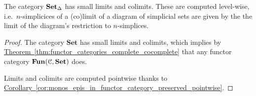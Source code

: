 \documentclass[main.tex]{subfiles}
\begin{document}
\begin{proposition}
  \label{prop:sset_has_limits_colimits}
  The category $\operatorname{\mathbf{Set}_{\Delta}}$ has small limits and colimits. These are computed level-wise, i.e.\ $n$-simplicices of a (co)limit of a diagram of simplicial sets are given by the the limit of the diagram's restriction to $n$-simplices.
\end{proposition}
\begin{proof}
  The category $\mathbf{Set}$ has small limits and colimits, which implies by \hyperref[thm:functor_categories_complete_cocomplete]{Theorem~\ref*{thm:functor_categories_complete_cocomplete}} that any functor category $\operatorname{\mathbf{Fun}}(\mathcal{C}, \mathbf{Set})$ does.

  Limits and colimits are computed pointwise thanks to \hyperref[cor:monos_epis_in_functor_category_preserved_pointwise]{Corollary~\ref*{cor:monos_epis_in_functor_category_preserved_pointwise}}.
\end{proof}
\end{document}
